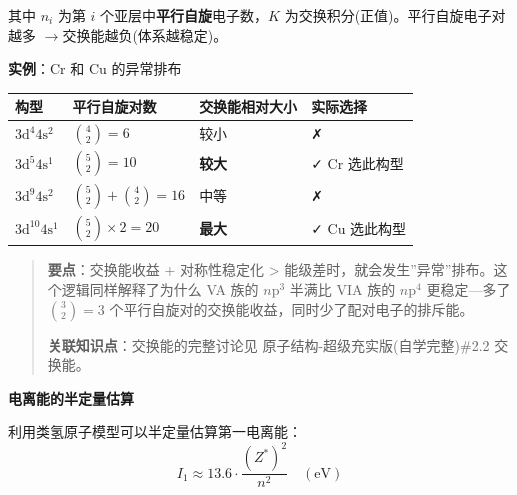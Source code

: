\documentclass[a4paper,11pt]{ctexart}
\newcounter{none}
\newcommand{\箭}{\ensuremath{\rightarrow}}
\newcommand{\左箭}{\ensuremath{\leftarrow}}
\newcommand{\上箭}{\ensuremath{\uparrow}}
\newcommand{\下箭}{\ensuremath{\downarrow}}
\newcommand{\衡}{\ensuremath{\rightleftharpoons}}
\newcommand{\双箭}{\ensuremath{\leftrightarrow}}
\newcommand{\约等于}{\ensuremath{\approx}}
\newcommand{\小于等于}{\ensuremath{\leq}}
\newcommand{\大于等于}{\ensuremath{\geq}}
\newcommand{\不等于}{\ensuremath{\neq}}
\newcommand{\西格马}{\ensuremath{\sigma}}
\newcommand{\派}{\ensuremath{\pi}}
\begin{document}
其中 \(n_i\) 为第 \(i\) 个亚层中\textbf{平行自旋}电子数，\(K\) 为交换积分(正值)。平行自旋电子对越多 \箭 交换能越负(体系越稳定)。

\textbf{实例}：Cr 和 Cu 的异常排布

{\def\LTcaptype{none} %
\begin{longtable}[]{@{}
  >{\centering\arraybackslash}p{}
  >{\centering\arraybackslash}p{}
  >{\centering\arraybackslash}p{}
  >{\centering\arraybackslash}p{}@{}}
\toprule\noalign{}
\begin{minipage}[b]{\linewidth}\centering
构型
\end{minipage} & \begin{minipage}[b]{\linewidth}\centering
平行自旋对数
\end{minipage} & \begin{minipage}[b]{\linewidth}\centering
交换能相对大小
\end{minipage} & \begin{minipage}[b]{\linewidth}\centering
实际选择
\end{minipage} \\
\midrule\noalign{}
\endhead
\bottomrule\noalign{}
\endlastfoot
\(3\mathrm{d}^4 4\mathrm{s}^2\) & \(\binom{4}{2}=6\) & 较小 & ✗ \\
\(3\mathrm{d}^5 4\mathrm{s}^1\) & \(\binom{5}{2}=10\) & \textbf{较大} & ✓ Cr 选此构型 \\
\(3\mathrm{d}^9 4\mathrm{s}^2\) & \(\binom{5}{2}+\binom{4}{2}=16\) & 中等 & ✗ \\
\(3\mathrm{d}^{10} 4\mathrm{s}^1\) & \(\binom{5}{2}\times2=20\) & \textbf{最大} & ✓ Cu 选此构型 \\
\end{longtable}
}

\begin{quote}
\textbf{要点}：交换能收益 + 对称性稳定化 \textgreater{} 能级差时，就会发生''异常''排布。这个逻辑同样解释了为什么 VA 族的 \(n\mathrm{p}^3\) 半满比 VIA 族的 \(n\mathrm{p}^4\) 更稳定---多了 \(\binom{3}{2}=3\) 个平行自旋对的交换能收益，同时少了配对电子的排斥能。

\textbf{关联知识点}：交换能的完整讨论见 原子结构-超级充实版(自学完整)\#2.2 交换能。
\end{quote}

\textbf{电离能的半定量估算}

利用类氢原子模型可以半定量估算第一电离能：
\[I_1 \approx 13.6 \cdot \frac{(Z^*)^2}{n^2} \quad (\text{eV})\]
\end{document}
